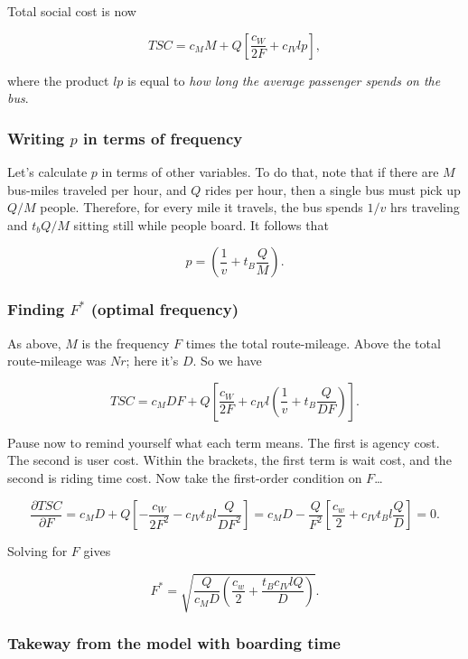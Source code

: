 \documentclass[11pt]{article}
\begin{document}
Total social cost is now

\[
TSC = c_MM + Q\left[\frac{c_W}{2F} + c_{IV} l p \right],
\]

where the product \(l p\) is equal to \emph{how long the average
passenger spends on the bus}.

\subsubsection{\texorpdfstring{Writing \(p\) in terms of
frequency}{Writing p in terms of frequency}}\label{writing-p-in-terms-of-frequency}

Let's calculate \(p\) in terms of other variables. To do that, note that
if there are \(M\) bus-miles traveled per hour, and \(Q\) rides per
hour, then a single bus must pick up \(Q/M\) people. Therefore, for
every mile it travels, the bus spends \(1/v\) hrs traveling and
\(t_bQ/M\) sitting still while people board. It follows that

\[
p = \left(\frac{1}{v} + t_B\frac{Q}{M} \right).
\]

\subsubsection{\texorpdfstring{Finding \(F^*\) (optimal
frequency)}{Finding F\^{}* (optimal frequency)}}\label{finding-f-optimal-frequency}

As above, \(M\) is the frequency \(F\) times the total route-mileage.
Above the total route-mileage was \(Nr\); here it's \(D\). So we have

\[
TSC = c_MDF + Q\left[\frac{c_W}{2F} + c_{IV} l \left(\frac{1}{v} + t_B\frac{Q}{DF} \right) \right].
\]

Pause now to remind yourself what each term means. The first is agency
cost. The second is user cost. Within the brackets, the first term is
wait cost, and the second is riding time cost. Now take the first-order
condition on \(F\)\ldots{}

\[
\frac{\partial TSC}{\partial F} = c_M D + Q\left[ -\frac{c_W}{2F^2} - c_{IV}t_Bl \frac{Q}{DF^2} \right] = c_M D - \frac{Q}{F^2}\left[\frac{c_w}{2} + c_{IV}t_Bl \frac{Q}{D} \right] = 0.
\]

Solving for \(F\) gives

\[
F^* = \sqrt{\frac{Q}{c_M D}\left(\frac{c_w}{2} + \frac{t_B c_{IV}lQ}{D} \right)}.
\]

\subsubsection{Takeway from the model with boarding
time}\label{takeway-from-the-model-with-boarding-time}
\end{document}
